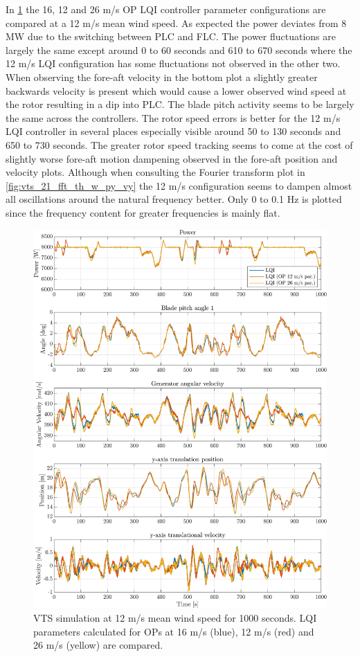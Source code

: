 In \cref{fig:vts_20_pow_th_w_py_vy} the 16, 12 and 26 m/s OP LQI controller parameter configurations are compared at a 12 m/s mean wind speed. As expected the power deviates from 8 MW due to the switching between PLC and FLC. The power fluctuations are largely the same except around 0 to 60 seconds and 610 to 670 seconds where the 12 m/s LQI configuration has some fluctuations not observed in the other two. When observing the fore-aft velocity in the bottom plot a slightly greater backwards velocity is present which would cause a lower observed wind speed at the rotor resulting in a dip into PLC. The blade pitch activity seems to be largely the same across the controllers. The rotor speed errors is better for the 12 m/s LQI controller in several places especially visible around 50 to 130 seconds and 650 to 730 seconds. The greater rotor speed tracking seems to come at the cost of slightly worse fore-aft motion dampening observed in the fore-aft position and velocity plots. Although when consulting the Fourier transform plot in \cref{fig:vts_21_fft_th_w_py_vy} the 12 m/s configuration seems to dampen almost all oscillations around the natural frequency better. Only 0 to 0.1 Hz is plotted since the frequency content for greater frequencies is mainly flat.

\begin{figure}[ht]
	\centering
	\includegraphics[width=0.7\linewidth]{Graphics/TestResults/VTSplotting/20_pow_th_w_py_vy.png}
	\caption{VTS simulation at 12 m/s mean wind speed for 1000 seconds. LQI parameters calculated for OPs at 16 m/s (blue), 12 m/s (red) and 26 m/s (yellow) are compared.}
	\label{fig:vts_20_pow_th_w_py_vy}
\end{figure}

